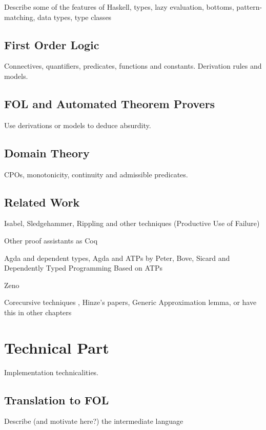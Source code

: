 \documentclass{report}
\begin{document}
Describe some of the features of Haskell, types, lazy evaluation,
bottoms, pattern-matching, data types, type classes

\section{First Order Logic}

Connectives, quantifiers, predicates, functions and constants.
Derivation rules and models.

\section{FOL and Automated Theorem Provers}

Use derivations or models to deduce absurdity.

\section{Domain Theory}

CPOs, monotonicity, continuity and admissible predicates.

\section{Related Work}

Isabel, Sledgehammer, Rippling and other techniques
(Productive Use of Failure)

Other proof assistants as Coq

Agda and dependent types, Agda and ATPs by Peter, Bove, Sicard
\cite{agdaatp} and Dependently Typed Programming Based on ATPs

Zeno

Corecursive techniques \cite{corecursive}, Hinze's papers, Generic
Approximation lemma, or have this in other chapters




\chapter{Technical Part}

Implementation technicalities.

\section{Translation to FOL}

Describe (and motivate here?) the intermediate language
\end{document}
